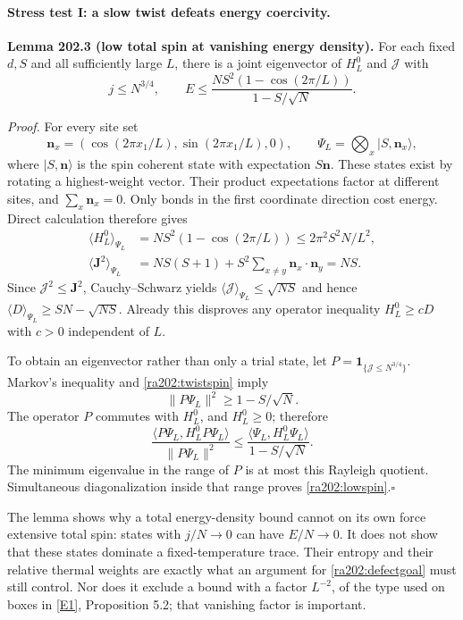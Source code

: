 \documentclass[11pt]{article}
\newcommand{\eref}[2]{\hyperlink{extra:#1:#2}{[E#2]}}
\begin{document}
	\paragraph{Stress test I: a slow twist defeats energy coercivity.}
	\textbf{Lemma 202.3 (low total spin at vanishing energy density).}
	For each fixed $d,S$ and all sufficiently large $L$, there is a joint
	eigenvector of $H_L^0$ and $\mathcal J$ with
	\begin{equation}\label{ra202:lowspin}
		j\leq N^{3/4},\qquad
		E\leq\frac{NS^2(1-\cos(2\pi/L))}{1-S/\sqrt N}.
	\end{equation}
	
	\emph{Proof.}
	For every site set
	\[
	\mathbf n_x=(\cos(2\pi x_1/L),\sin(2\pi x_1/L),0),
	\qquad \Psi_L=\bigotimes_x |S,\mathbf n_x\rangle,
	\]
	where $|S,\mathbf n\rangle$ is the spin coherent state with expectation
	$S\mathbf n$. These states exist by rotating a highest-weight vector.
	Their product expectations factor at different sites, and
	$\sum_x\mathbf n_x=0$. Only bonds in the first coordinate direction
	cost energy. Direct calculation therefore gives
	\begin{align}
		\langle H_L^0\rangle_{\Psi_L}
		&=NS^2(1-\cos(2\pi/L))\leq 2\pi^2S^2N/L^2,
		\label{ra202:twistenergy}\\
		\langle\mathbf J^2\rangle_{\Psi_L}
		&=NS(S+1)+S^2\sum_{x\ne y}\mathbf n_x\cdot\mathbf n_y=NS.
		\label{ra202:twistspin}
	\end{align}
	Since $\mathcal J^2\leq\mathbf J^2$, Cauchy--Schwarz yields
	$\langle\mathcal J\rangle_{\Psi_L}\leq\sqrt{NS}$ and hence
	$\langle D\rangle_{\Psi_L}\geq SN-\sqrt{NS}$.
	Already this disproves any operator inequality $H_L^0\geq cD$ with
	$c>0$ independent of $L$.
	
	To obtain an eigenvector rather than only a trial state, let
	$P=\mathbf1_{\{\mathcal J\leq N^{3/4}\}}$. Markov's inequality and
	\eqref{ra202:twistspin} imply
	\[
	\|P\Psi_L\|^2\geq1-S/\sqrt N.
	\]
	The operator $P$ commutes with $H_L^0$, and $H_L^0\geq0$; therefore
	\[
	\frac{\langle P\Psi_L,H_L^0P\Psi_L\rangle}{\|P\Psi_L\|^2}
	\leq\frac{\langle\Psi_L,H_L^0\Psi_L\rangle}{1-S/\sqrt N}.
	\]
	The minimum eigenvalue in the range of $P$ is at most this Rayleigh
	quotient. Simultaneous diagonalization inside that range proves
	\eqref{ra202:lowspin}.\hfill$\square$
	
	The lemma shows why a total energy-density bound cannot on its own
	force extensive total spin: states with $j/N\to0$ can have $E/N\to0$.
	It does not show that these states dominate a fixed-temperature trace.
	Their entropy and their relative thermal weights are exactly what an
	argument for \eqref{ra202:defectgoal} must still control. Nor does it
	exclude a bound with a factor $L^{-2}$, of the type used on boxes in
	\eref{202}{1}, Proposition 5.2; that vanishing factor is important.
	
\end{document}
